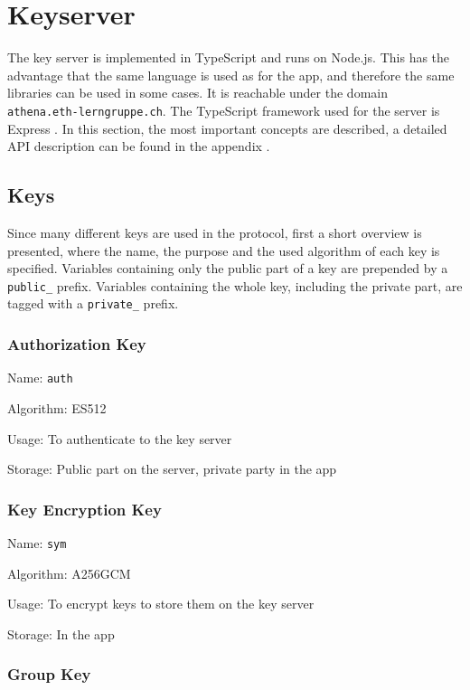 \documentclass[a4paper, oneside]{discothesis}
\begin{document}
\section{Keyserver}

The key server is implemented in TypeScript and runs on Node.js. This has the advantage that the same language is used as for the app, and therefore the same libraries can be used in some cases. It is reachable under the domain \texttt{athena.eth-lerngruppe.ch}. The TypeScript framework used for the server is Express \cite{Express}. In this section, the most important concepts are described, a detailed API description can be found in the appendix .

\subsection{Keys}

\label{sec:keys}

Since many different keys are used in the protocol, first a short overview is presented, where the name, the purpose and the used algorithm of each key is specified. Variables containing only the public part of a key are prepended by a \texttt{public\_} prefix. Variables containing the whole key, including the private part, are tagged with a \texttt{private\_} prefix.

\subsubsection{Authorization Key}

Name: \texttt{auth}

\noindent
Algorithm: ES512

\noindent
Usage: To authenticate to the key server

\noindent
Storage: Public part on the server, private party in the app

\subsubsection{Key Encryption Key}

Name: \texttt{sym}

\noindent
Algorithm: A256GCM

\noindent
Usage: To encrypt keys to store them on the key server

\noindent
Storage: In the app

\subsubsection{Group Key}
\end{document}
